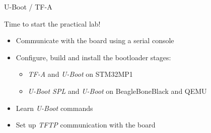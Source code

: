 \setuplabframe
{U-Boot / TF-A}
{
  Time to start the practical lab!
  \begin{itemize}
  \item Communicate with the board using a serial console
  \item Configure, build and install the bootloader stages:
        \begin{itemize}
		\item {\em TF-A} and {\em U-Boot} on STM32MP1
		\item {\em U-Boot SPL} and {\em U-Boot} on BeagleBoneBlack and QEMU
	\end{itemize}
  \item Learn {\em U-Boot} commands
  \item Set up {\em TFTP} communication with the board
  \end{itemize}
}
